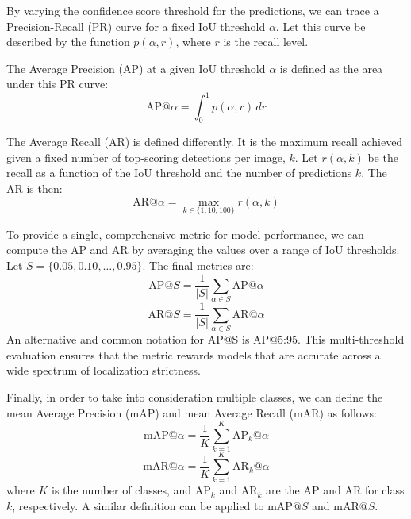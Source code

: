 By varying the confidence score threshold for the predictions, we can trace a Precision-Recall (PR) curve for a fixed IoU threshold $\alpha$. Let this curve be described by the function $p(\alpha, r)$, where $r$ is the recall level.

The Average Precision (AP) at a given IoU threshold $\alpha$ is defined as the area under this PR curve:
\begin{equation}
    \text{AP}@\alpha = \int_{0}^{1} p(\alpha, r) \,dr
\end{equation}

The Average Recall (AR) is defined differently. It is the maximum recall achieved given a fixed number of top-scoring detections per image, $k$. Let $r(\alpha, k)$ be the recall as a function of the IoU threshold and the number of predictions $k$. The AR is then:
\begin{equation}
    \text{AR}@\alpha = \max_{k \in \{1, 10, 100\}} r(\alpha, k)
\end{equation}

To provide a single, comprehensive metric for model performance, we can compute the AP and AR by averaging the values over a range of IoU thresholds. Let $S = \{0.05, 0.10, \dots, 0.95\}$. The final metrics are:
\begin{equation}
    \text{AP}@S = \frac{1}{|S|} \sum_{\alpha \in S} \text{AP}@\alpha
\end{equation}
\begin{equation}
    \text{AR}@S = \frac{1}{|S|} \sum_{\alpha \in S} \text{AR}@\alpha
\end{equation}
An alternative and common notation for AP@S is AP@5:95. This multi-threshold evaluation ensures that the metric rewards models that are accurate across a wide spectrum of localization strictness.

Finally, in order to take into consideration multiple classes, we can define the mean Average Precision (mAP) and mean Average Recall (mAR) as follows:
\begin{equation}
    \text{mAP}@\alpha = \frac{1}{K} \sum_{k=1}^{K} \text{AP}_k@\alpha
\end{equation}
\begin{equation}
    \text{mAR}@\alpha = \frac{1}{K} \sum_{k=1}^{K} \text{AR}_k@\alpha
\end{equation}
where $K$ is the number of classes, and $\text{AP}_k$ and $\text{AR}_k$ are the AP and AR for class $k$, respectively. A similar definition can be applied to $\mathrm{mAP}@S$ and $\mathrm{mAR}@S$.


